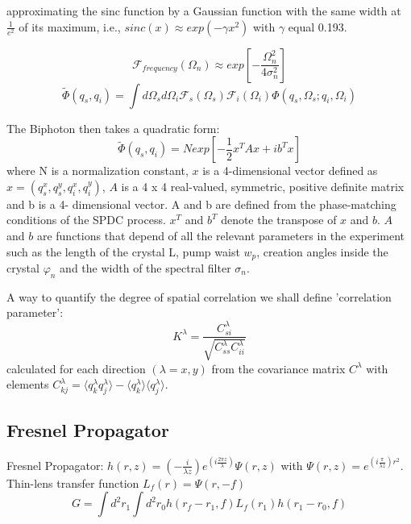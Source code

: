 approximating the sinc function by a Gaussian function with the same width at $\frac{1}{e^2}$ of its maximum, i.e., $sinc(x)\approx exp(- \gamma x^2)$  with $\gamma$ equal 0.193. 

\begin{equation}
\mathcal{F}_{frequency}(\Omega_n) \approx exp \left[-\frac{ \Omega^2_n}{4 \sigma^2_n} \right] 
\end{equation}
\begin{equation}
\tilde{\Phi}(q_s,q_i)=\int d\Omega_s d\Omega_i \mathcal{F}_s (\Omega_s) \mathcal{F}_i (\Omega_i) \Phi(q_s,\Omega_s;q_i,\Omega_i)
\end{equation}

The Biphoton then takes a quadratic form:
\begin{equation}\label{eq:quadratic}
\tilde{\Phi}(q_s,q_i)=N exp\left[ -\frac{1}{2}x^T A x + i b^T x \right]
\end{equation}
where N is a normalization constant, $x$ is a 4-dimensional vector defined as $x = (q^x_s, q^y_s ,q^x_i,q^y_i )$, $A$ is a 4 x 4 real-valued, symmetric, positive definite matrix and b is a 4- dimensional vector. A and b are defined from the phase-matching conditions of the SPDC process. $x^T$ and $b^T$ denote the transpose of $x$ and $b$. $A$ and $b$ are functions that depend of all the relevant parameters in the experiment such as the length of the crystal L, pump waist $w_p$, creation angles inside the crystal $\varphi_n$ and the width of the spectral filter $\sigma_n$.

A way to quantify the degree of spatial correlation we shall define 'correlation parameter':
\begin{equation}
K^\lambda = \frac{C^\lambda_{si}}{\sqrt{C^\lambda_{ss}C^\lambda_{ii}}}
\end{equation}
calculated for each direction $(\lambda = x, y)$ from the covariance matrix $C^\lambda$ with elements $C^\lambda_{kj} = \langle q^\lambda_k q^\lambda_j \rangle - \langle q^\lambda_k \rangle \langle q^\lambda_j \rangle $.


\subsection{Fresnel Propagator}


Fresnel Propagator: $h(r,z)=(- \frac{i}{\lambda z})e^{(i \frac{2 \pi z}{\lambda})} \Psi (r,z)$ 
with $\Psi(r,z) = e^{(i \frac{\pi}{\lambda z })r^2}$. Thin-lens transfer function $L_f (r)=\Psi(r,-f)$
 \\
\begin{equation}\label{eq:green}
G= \int d^2 r_1 \int d^2 r_0 h(r_f - r_1,f) L_f(r_1) h(r_1 - r_0,f)
\end{equation}

